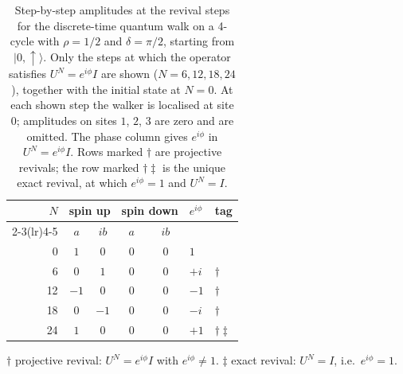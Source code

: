 \begin{table}[htbp]
\centering
\caption{Step-by-step amplitudes at the revival steps for the
discrete-time quantum walk on a 4-cycle with $\rho = 1/2$ and
$\delta = \pi/2$, starting from $|0, \uparrow\rangle$. Only the
steps at which the operator satisfies $U^N = e^{i\phi} I$ are shown
($N = 6, 12, 18, 24$), together with the initial state at $N = 0$.
At each shown step the walker is localised at site $0$; amplitudes
on sites $1$, $2$, $3$ are zero and are omitted. The phase column
gives $e^{i\phi}$ in $U^N = e^{i\phi} I$. Rows marked $\dagger$ are
projective revivals; the row marked $\dagger\ddagger$ is the unique
exact revival, at which $e^{i\phi} = 1$ and $U^N = I$. }
\label{tab:k4-demo}
\small
\setlength{\tabcolsep}{6pt}
\renewcommand{\arraystretch}{1.2}
\begin{tabular}{@{}r c c c c l l@{}}
\toprule
$N$ & \multicolumn{2}{c}{spin up} & \multicolumn{2}{c}{spin down} & $e^{i\phi}$ & tag \\
\cmidrule(lr){2-3}\cmidrule(lr){4-5}
 & $a$ & $ib$ & $a$ & $ib$ & & \\
\midrule
0  & $1$  & $0$  & $0$ & $0$ & $1$  & \\
6  & $0$  & $1$  & $0$ & $0$ & $+i$ & $\dagger$ \\
12 & $-1$ & $0$  & $0$ & $0$ & $-1$ & $\dagger$ \\
18 & $0$  & $-1$ & $0$ & $0$ & $-i$ & $\dagger$ \\
24 & $1$  & $0$  & $0$ & $0$ & $+1$ & $\dagger\ddagger$ \\
\bottomrule
\end{tabular}
\vspace{0.5em}
\begin{minipage}{\linewidth}
\footnotesize
$\dagger$ projective revival: $U^N = e^{i\phi} I$ with
$e^{i\phi} \neq 1$. $\ddagger$ exact revival: $U^N = I$, i.e.\
$e^{i\phi} = 1$.
\end{minipage}
\end{table}

